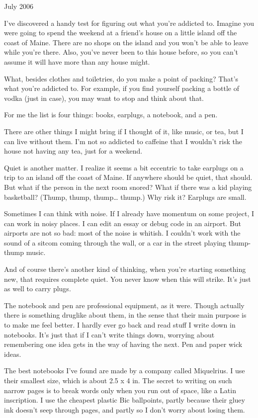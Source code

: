 \documentclass[12pt]{book}
\begin{document}
July 2006

I've discovered a handy test for figuring out what you're addicted to.
Imagine you were going to spend the weekend at a friend's house on a
little island off the coast of Maine. There are no shops on the island
and you won't be able to leave while you're there. Also, you've never
been to this house before, so you can't assume it will have more than
any house might.

What, besides clothes and toiletries, do you make a point of packing?
That's what you're addicted to. For example, if you find yourself
packing a bottle of vodka (just in case), you may want to stop and think
about that.

For me the list is four things: books, earplugs, a notebook, and a pen.

There are other things I might bring if I thought of it, like music, or
tea, but I can live without them. I'm not so addicted to caffeine that I
wouldn't risk the house not having any tea, just for a weekend.

Quiet is another matter. I realize it seems a bit eccentric to take
earplugs on a trip to an island off the coast of Maine. If anywhere
should be quiet, that should. But what if the person in the next room
snored? What if there was a kid playing basketball? (Thump, thump,
thump\ldots{} thump.) Why risk it? Earplugs are small.

Sometimes I can think with noise. If I already have momentum on some
project, I can work in noisy places. I can edit an essay or debug code
in an airport. But airports are not so bad: most of the noise is
whitish. I couldn't work with the sound of a sitcom coming through the
wall, or a car in the street playing thump-thump music.

And of course there's another kind of thinking, when you're starting
something new, that requires complete quiet. You never know when this
will strike. It's just as well to carry plugs.

The notebook and pen are professional equipment, as it were. Though
actually there is something druglike about them, in the sense that their
main purpose is to make me feel better. I hardly ever go back and read
stuff I write down in notebooks. It's just that if I can't write things
down, worrying about remembering one idea gets in the way of having the
next. Pen and paper wick ideas.

The best notebooks I've found are made by a company called Miquelrius. I
use their smallest size, which is about 2.5 x 4 in. The secret to
writing on such narrow pages is to break words only when you run out of
space, like a Latin inscription. I use the cheapest plastic Bic
ballpoints, partly because their gluey ink doesn't seep through pages,
and partly so I don't worry about losing them.
\end{document}
